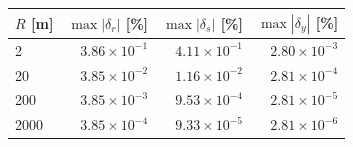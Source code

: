 \begin{tabular}{lrrr}
\toprule
$R$ [m] & $\max|\delta_r|$ [\%] & $\max|\delta_s|$ [\%] & $\max|\delta_y|$ [\%] \\
\midrule
2 & $3.86\times10^{-1}$ & $4.11\times10^{-1}$ & $2.80\times10^{-3}$ \\
20 & $3.85\times10^{-2}$ & $1.16\times10^{-2}$ & $2.81\times10^{-4}$ \\
200 & $3.85\times10^{-3}$ & $9.53\times10^{-4}$ & $2.81\times10^{-5}$ \\
2000 & $3.85\times10^{-4}$ & $9.33\times10^{-5}$ & $2.81\times10^{-6}$ \\
\bottomrule
\end{tabular}

